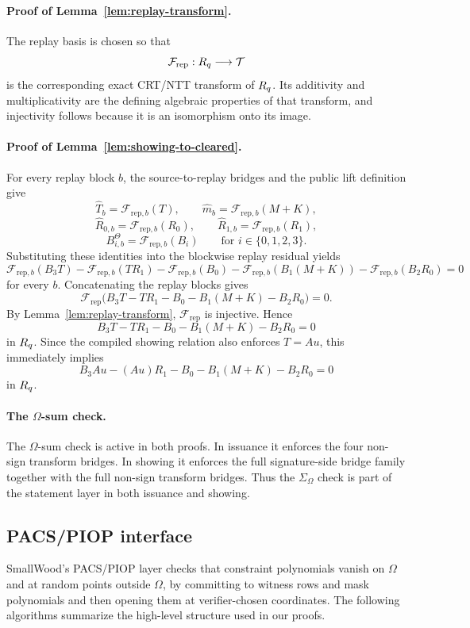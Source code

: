 \paragraph{Proof of Lemma~\ref{lem:replay-transform}.}
The replay basis is chosen so that
\[
\mathcal F_{\mathrm{rep}} : R_q \longrightarrow \mathcal T
\]
is the corresponding exact CRT/NTT transform of \(R_q\). Its additivity and multiplicativity are the defining algebraic
properties of that transform, and injectivity follows because it is an isomorphism onto its image.

\paragraph{Proof of Lemma~\ref{lem:showing-to-cleared}.}
For every replay block \(b\), the source-to-replay bridges and the public lift definition give
\[
\widehat T_b = \mathcal F_{\mathrm{rep},b}(T),
\qquad
\widehat m_b = \mathcal F_{\mathrm{rep},b}(M+K),
\]
\[
\widehat R_{0,b} = \mathcal F_{\mathrm{rep},b}(R_0),
\qquad
\widehat R_{1,b} = \mathcal F_{\mathrm{rep},b}(R_1),
\]
\[
B_{i,b}^\Theta = \mathcal F_{\mathrm{rep},b}(B_i)
\qquad\text{for }i\in\{0,1,2,3\}.
\]
Substituting these identities into the blockwise replay residual yields
\[
\mathcal F_{\mathrm{rep},b}(B_3T)
-
\mathcal F_{\mathrm{rep},b}(TR_1)
-
\mathcal F_{\mathrm{rep},b}(B_0)
-
\mathcal F_{\mathrm{rep},b}(B_1(M+K))
-
\mathcal F_{\mathrm{rep},b}(B_2R_0)
=0
\]
for every \(b\). Concatenating the replay blocks gives
\[
\mathcal F_{\mathrm{rep}}
\bigl(B_3T-TR_1-B_0-B_1(M+K)-B_2R_0\bigr)=0.
\]
By Lemma~\ref{lem:replay-transform}, \(\mathcal F_{\mathrm{rep}}\) is injective. Hence
\[
B_3T-TR_1-B_0-B_1(M+K)-B_2R_0=0
\]
in \(R_q\). Since the compiled showing relation also enforces \(T=Au\), this immediately implies
\[
B_3Au-(Au)R_1-B_0-B_1(M+K)-B_2R_0=0
\]
in \(R_q\).

\paragraph{The \(\Omega\)-sum check.}
The \(\Omega\)-sum check is active in both proofs. In issuance it enforces the
four non-sign transform bridges. In showing it enforces the full signature-side
bridge family together with the full non-sign transform bridges. Thus the
\(\Sigma_\Omega\) check is part of the statement layer in both issuance and
showing.

\subsection{PACS/PIOP interface}
SmallWood's PACS/PIOP layer checks that constraint polynomials vanish on
\(\Omega\) and at random points outside \(\Omega\), by committing to witness
rows and mask polynomials and then opening them at verifier-chosen
coordinates. The following algorithms summarize the high-level structure used in
our proofs.

